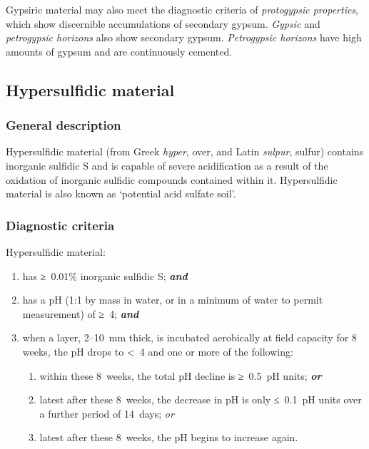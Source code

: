\documentclass[
  letterpaper,
  DIV=11,
  numbers=noendperiod]{scrreprt}
\providecommand{\tightlist}{%
  \setlength{\itemsep}{0pt}\setlength{\parskip}{0pt}}\usepackage{longtable,booktabs,array}
\begin{document}
Gypsiric material may also meet the diagnostic criteria of
\emph{protogypsic properties}, which show discernible accumulations of
secondary gypsum. \emph{Gypsic} and \emph{petrogypsic horizons} also
show secondary gypsum. \emph{Petrogypsic horizons} have high amounts of
gypsum and are continuously cemented.

\hypertarget{hypersulfidic-material}{%
\subsection{Hypersulfidic material}\label{hypersulfidic-material}}

\hypertarget{general-description-60}{%
\subsubsection{General description}\label{general-description-60}}

Hypersulfidic material (from Greek \emph{hyper}, over, and Latin
\emph{sulpur}, sulfur) contains inorganic sulfidic S and is capable of
severe acidification as a result of the oxidation of inorganic sulfidic
compounds contained within it. Hypersulfidic material is also known as
`potential acid sulfate soil'.

\hypertarget{diagnostic-criteria-64}{%
\subsubsection{Diagnostic criteria}\label{diagnostic-criteria-64}}

Hypersulfidic material:

\begin{enumerate}
\def\labelenumi{\arabic{enumi}.}
\item
  has ≥~0.01\% inorganic sulfidic S; \textbf{\emph{and}}
\item
  has a pH (1:1 by mass in water, or in a minimum of water to permit
  measurement) of ≥~4; \textbf{\emph{and}}
\item
  when a layer, 2--10~mm thick, is incubated aerobically at field
  capacity for 8 weeks, the pH drops to \textless~4 and one or more of
  the following:

  \begin{enumerate}
  \def\labelenumii{\alph{enumii}.}
  \tightlist
  \item
    within these 8~weeks, the total pH decline is ≥~0.5~pH units;
    \textbf{\emph{or}}
  \item
    latest after these 8~weeks, the decrease in pH is only ≤~0.1~pH
    units over a further period of 14~days; \emph{or}
  \item
    latest after these 8~weeks, the pH begins to increase again.
  \end{enumerate}
\end{enumerate}
\end{document}
